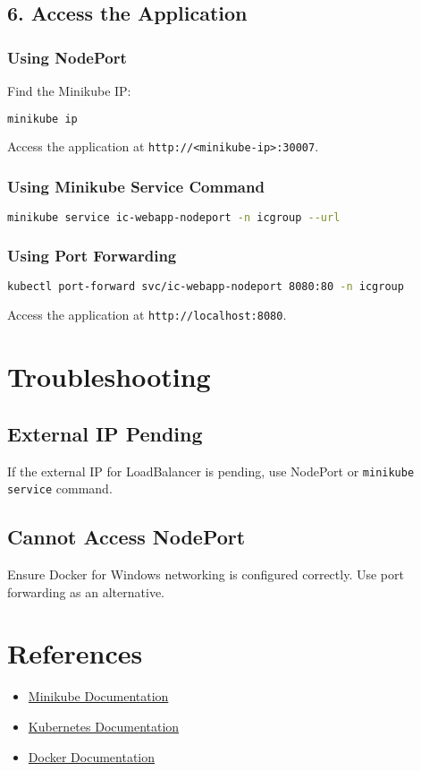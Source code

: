 \documentclass{article}
\begin{document}
\subsection*{6. Access the Application}

\subsubsection*{Using NodePort}
Find the Minikube IP:
\begin{lstlisting}[language=bash]
minikube ip
\end{lstlisting}

Access the application at \texttt{http://<minikube-ip>:30007}.

\subsubsection*{Using Minikube Service Command}
\begin{lstlisting}[language=bash]
minikube service ic-webapp-nodeport -n icgroup --url
\end{lstlisting}

\subsubsection*{Using Port Forwarding}
\begin{lstlisting}[language=bash]
kubectl port-forward svc/ic-webapp-nodeport 8080:80 -n icgroup
\end{lstlisting}

Access the application at \texttt{http://localhost:8080}.

\section*{Troubleshooting}

\subsection*{External IP Pending}
If the external IP for LoadBalancer is pending, use NodePort or \texttt{minikube service} command.

\subsection*{Cannot Access NodePort}
Ensure Docker for Windows networking is configured correctly. Use port forwarding as an alternative.

\section*{References}
\begin{itemize}
    \item \href{https://minikube.sigs.k8s.io/docs/}{Minikube Documentation}
    \item \href{https://kubernetes.io/docs/}{Kubernetes Documentation}
    \item \href{https://docs.docker.com/}{Docker Documentation}
\end{itemize}
\end{document}
